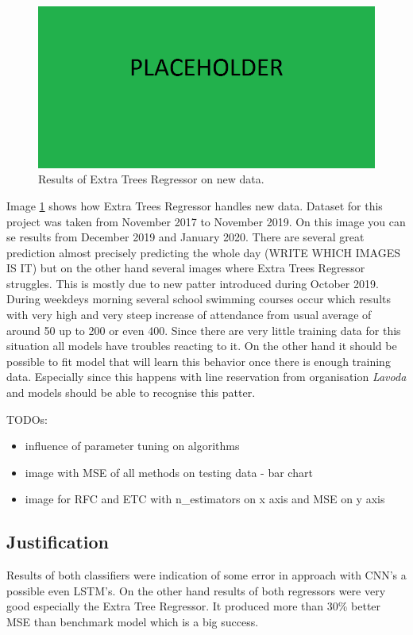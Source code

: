 \documentclass{article}
\begin{document}
\begin{figure}[h!]
\centering
\includegraphics[width=16cm]{imgs/placeholder.png}
\caption{Results of Extra Trees Regressor on new data.}
\label{fig:new_data}
\end{figure}

Image \ref{fig:new_data} shows how Extra Trees Regressor handles new data. Dataset for this project was taken from November 2017 to November 2019. On this image you can se results from December 2019 and January 2020. There are several great prediction almost precisely predicting the whole day (WRITE WHICH IMAGES IS IT) but on the other hand several images where Extra Trees Regressor struggles. This is mostly due to new patter introduced during October 2019. During weekdeys morning several school swimming courses occur which results with very high and very steep increase of attendance from usual average of around 50 up to 200 or even 400. Since there are very little training data for this situation all models have troubles reacting to it. On the other hand it should be possible to fit model that will learn this behavior once there is enough training data. Especially since this happens with line reservation from organisation \emph{Lavoda} and models should be able to recognise this patter.

\color{red}
TODOs:
\begin{itemize}
    \item influence of parameter tuning on algorithms
    \item image with MSE of all methods on testing data - bar chart
    \item image for RFC and ETC with n\_estimators on x axis and MSE on y axis
\end{itemize}
\color{black}

\subsection{Justification}
Results of both classifiers were indication of some error in approach with CNN's a possible even LSTM's. On the other hand results of both regressors were very good especially the Extra Tree Regressor. It produced more than 30\% better MSE than benchmark model which is a big success. 
\end{document}
